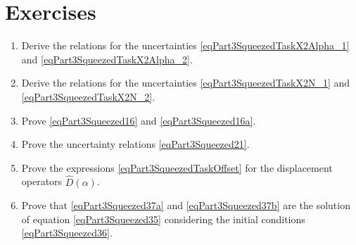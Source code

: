 \section{Exercises}
\begin{enumerate}
\item Derive the relations for the uncertainties
  \eqref{eqPart3SqueezedTaskX2Alpha_1} and
  \eqref{eqPart3SqueezedTaskX2Alpha_2}.
\item Derive the relations for the uncertainties
  \eqref{eqPart3SqueezedTaskX2N_1} and
  \eqref{eqPart3SqueezedTaskX2N_2}.
\item Prove \eqref{eqPart3Squeezed16} and
  \eqref{eqPart3Squeezed16a}. 
\item Prove the uncertainty relations
  \eqref{eqPart3Squeezed21}. 
\item Prove the expressions \eqref{eqPart3SqueezedTaskOffset} for
  the displacement operators $\hat{D}\left(\alpha\right)$.
\item Prove that \eqref{eqPart3Squeezed37a} and
  \eqref{eqPart3Squeezed37b} are the solution 
  of equation \eqref{eqPart3Squeezed35} considering the initial
  conditions \eqref{eqPart3Squeezed36}.
\end{enumerate}